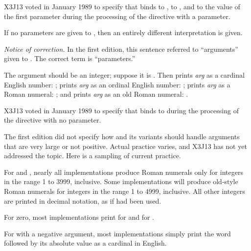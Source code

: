 \begin{flushdesc}
\begin{new}
X3J13 voted in January 1989
to specify that  binds 
to ,  to , and  to the value
of the first parameter
during the processing of the  directive with a parameter.
\end{new}

If no parameters are given to , then an entirely different
interpretation is given.
\begin{new}%
\emph{Notice of correction.}
In the first edition, this sentence referred to ``arguments'' given to .
The correct term is ``parameters.''
\end{new}
The argument should be an integer;
suppose it is . Then
 prints \emph{arg} as a cardinal English number: ;
 prints \emph{arg} as an ordinal English number: ;
 prints \emph{arg} as a Roman numeral: ; and
 prints \emph{arg} as an old Roman numeral: .

\begin{new}
X3J13 voted in January 1989
to specify that  binds  to 
during the processing of the  directive with no parameter.
\end{new}

\begin{new}
The first edition did not specify how  and its variants should
handle arguments that are very large or not positive.  Actual practice varies,
and X3J13 has not yet addressed the topic.
Here is a sampling of current practice.

For  and , nearly all implementations
produce Roman numerals only for integers in the range 1 to 3999, inclusive.
Some implementations will produce old-style Roman numerals for integers in
the range 1 to 4999, inclusive.  All other integers are printed in decimal
notation, as if  had been used.

For zero, most implementations print  for 
and  for .

For  with a negative argument, most implementations simply print
the word  followed by its absolute value as a cardinal in English.


\end{new}
\end{flushdesc}
